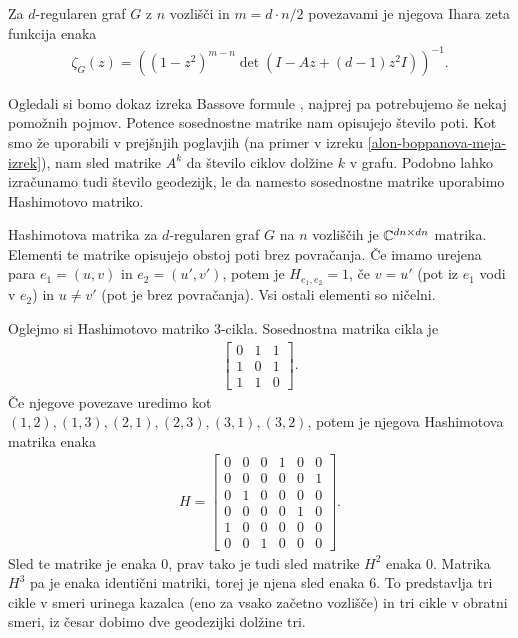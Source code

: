 \begin{izrek}\label{zeta-je-racionalna-bass}
    Za \(d\)-regularen graf \(G\) z \(n\) vozlišči in \(m=d\cdot n / 2\) povezavami je njegova Ihara zeta funkcija enaka
    \begin{align*}
        \zeta_G(z) = \left((1-z^2)^{m-n}\det(I-Az+(d-1)z^2I)\right)^{-1}.
    \end{align*}
\end{izrek}
Ogledali si bomo dokaz izreka Bassove formule \cite{rangarajan:LIPIcs.FSTTCS.2017.46}, najprej pa potrebujemo še nekaj pomožnih pojmov. Potence sosednostne matrike nam opisujejo število poti. Kot smo že uporabili v prejšnjih poglavjih (na primer v izreku \ref{alon-boppanova-meja-izrek}), nam sled matrike \(A^k\) da število ciklov dolžine \(k\) v grafu. Podobno lahko izračunamo tudi število geodezijk, le da namesto sosednostne matrike uporabimo Hashimotovo matriko.
\begin{definicija}
    Hashimotova matrika za \(d\)-regularen graf \(G\) na \(n\) vozliščih je \(\mathbb C^{dn\times dn}\) matrika. Elementi te matrike opisujejo obstoj poti brez povračanja. Če imamo urejena para \(e_1 = (u, v)\) in \(e_2= (u', v')\), potem je \(H_{e_1, e_2}=1\), če \(v = u'\) (pot iz \(e_1\) vodi v \(e_2\)) in \(u\neq v'\) (pot je brez povračanja). Vsi ostali elementi so ničelni.
\end{definicija}
\begin{primer}
    Oglejmo si Hashimotovo matriko \(3\)-cikla. Sosednostna matrika cikla je
    \begin{align*}
        \begin{bmatrix}
            0&1&1\\
            1&0&1\\
            1&1&0
        \end{bmatrix}.
    \end{align*}
    Če njegove povezave uredimo kot \((1,2), (1,3), (2,1), (2,3), (3,1), (3,2)\), potem je njegova Hashimotova matrika enaka
    \begin{align*}
        H = \begin{bmatrix}
            0&0&0&1&0&0\\
            0&0&0&0&0&1\\
            0&1&0&0&0&0\\
            0&0&0&0&1&0\\
            1&0&0&0&0&0\\
            0&0&1&0&0&0
        \end{bmatrix}.
    \end{align*}
    Sled te matrike je enaka \(0\), prav tako je tudi sled matrike \(H^2\) enaka 0. Matrika \(H^3\) pa je enaka identični matriki, torej je njena sled enaka \(6\). To predstavlja tri cikle v smeri urinega kazalca (eno za vsako začetno vozlišče) in tri cikle v obratni smeri, iz česar dobimo dve geodezijki dolžine tri. 
\end{primer}
